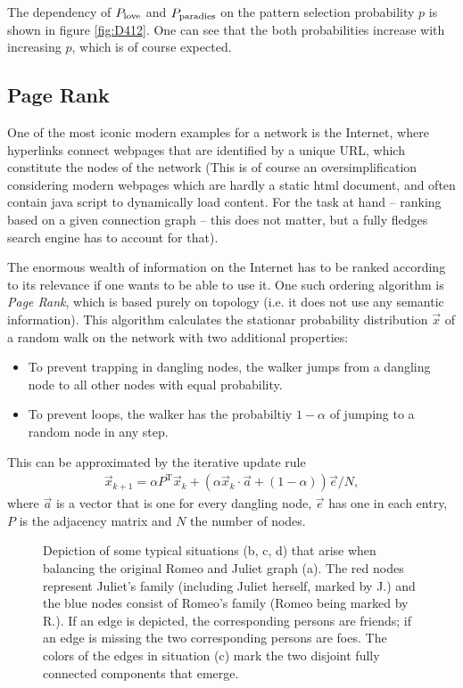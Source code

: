 \documentclass{scrartcl}
\begin{document}
The dependency of $P_{\mathrm{love}}$ and $P_{\mathrm{paradies}}$ on the pattern
selection probability $p$ is shown in figure \ref{fig:D412}. One can
see that the both probabilities increase with increasing $p$, which is
of course expected.

\subsection{Page Rank}
One of the most iconic modern examples for a network is the Internet, 
where hyperlinks connect webpages that are identified 
by a unique URL, which constitute the nodes of the network (This is of course
an oversimplification considering modern webpages which are hardly a static 
html document, and often contain java script to dynamically load content. For
the task at hand -- ranking based on a given connection graph -- this does not
matter, but a fully fledges search engine has to account for that).

The enormous wealth of information on the Internet has to be ranked according
to its relevance if one wants to be able to use it. One such ordering algorithm 
is \emph{Page Rank}, which is based purely on topology (i.e. it does not use 
any semantic information). This algorithm calculates the stationar probability 
distribution $\vec{x}$ of a random walk on the network with two additional properties:
\begin{itemize}
 \item To prevent trapping in dangling nodes, the walker jumps from a dangling node
		to all other nodes with equal probability.
 \item To prevent loops, the walker has the probabiltiy $1-\alpha$ of jumping to a random	
	node in any step.
\end{itemize}

This can be approximated by the iterative update rule
\begin{align}
	\vec{x}_{k+1} = \alpha P^\mathrm{T} \vec{x}_k + \left(\alpha \vec{x}_k \cdot \vec{a} + (1 - \alpha) \right) \vec{e}/N,
\end{align}
where $\vec{a}$ is a vector that is one for every dangling node, $\vec{e}$ has one in each entry, $P$ is the
adjacency matrix and $N$ the number of nodes.



\begin{figure}
    \centering
    \def\svgwidth{0.9\textwidth}
    
    \caption{Depiction of some typical situations (b, c, d) that arise when
        balancing the original Romeo and Juliet graph (a). The red nodes
        represent Juliet's family (including Juliet herself, marked by J.) and
        the blue nodes consist of Romeo's family (Romeo being marked by
        R.). If an edge is depicted, the corresponding persons are friends;
        if an edge is missing the two corresponding persons are foes. The
        colors of the edges in situation (c) mark the two disjoint fully
        connected components that emerge.}
    \label{fig:D41}
\end{figure}
\end{document}
